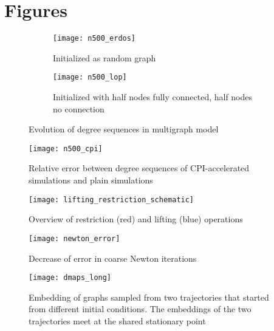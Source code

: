 \section*{Figures}

\begin{centering}

\begin{figure}[h!]
  \centering
  \begin{subfigure}{0.5\linewidth}
    \texttt{[image: n500\_erdos]}
    \caption{Initialized as  random graph}
    \label{mm:evo1}
  \end{subfigure}%
  \begin{subfigure}{0.5\linewidth}
    \texttt{[image: n500\_lop]}
    \caption{Initialized with half nodes fully connected, half nodes no connection}
    \label{mm:evo2}
  \end{subfigure}%
  \caption{Evolution of degree sequences in multigraph model}
  \label{mm:evo}
\end{figure}

\begin{figure}[h!]
  \centering
  \texttt{[image: n500\_cpi]}
  \caption{Relative error between degree sequences of CPI-accelerated simulations and plain simulations}
  \label{mm:cpi}
\end{figure}

\newpage
\begin{landscape}

\begin{figure}[h!]
  \centering
  \texttt{[image: lifting\_restriction\_schematic]}
  \caption{Overview of restriction (red) and lifting (blue) operations}
  \label{mm:schematic}
\end{figure}

\end{landscape}


\begin{figure}[h!]
  \centering
  \texttt{[image: newton\_error]}
  \caption{Decrease of error in coarse Newton iterations}
  \label{mm:newton}
\end{figure}

\begin{figure}[h!]
  \texttt{[image: dmaps\_long]}
  \caption{Embedding of graphs sampled from two trajectories that started from different initial conditions. The embeddings of the two trajectories meet at the shared stationary point}
  \label{mm:dmaps2}
\end{figure}


\end{centering}
